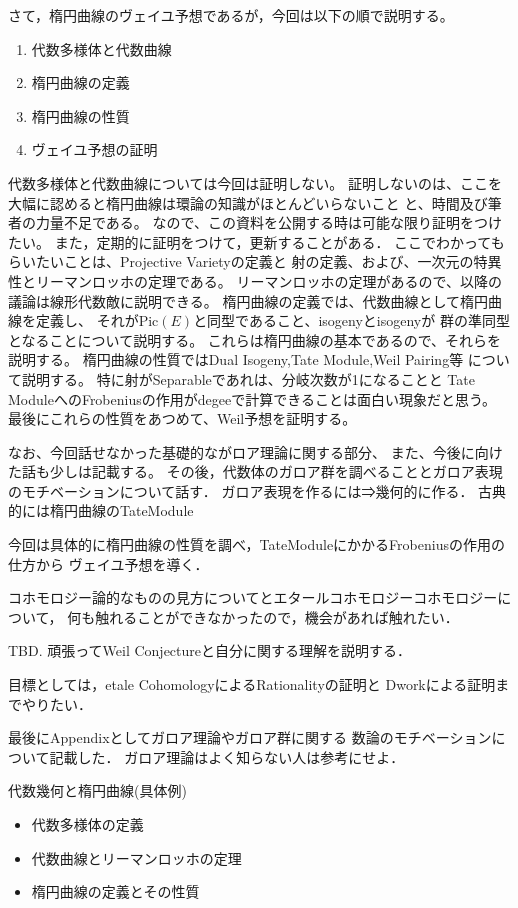 \documentclass{ujarticle}
\begin{document}
さて，楕円曲線のヴェイユ予想であるが，今回は以下の順で説明する。
\begin{enumerate}
  \item 代数多様体と代数曲線
  \item 楕円曲線の定義
  \item 楕円曲線の性質
  \item ヴェイユ予想の証明
\end{enumerate}
代数多様体と代数曲線については今回は証明しない。
証明しないのは、ここを大幅に認めると楕円曲線は環論の知識がほとんどいらないこと
と、時間及び筆者の力量不足である。
なので、この資料を公開する時は可能な限り証明をつけたい。
また，定期的に証明をつけて，更新することがある．
ここでわかってもらいたいことは、Projective Varietyの定義と
射の定義、および、一次元の特異性とリーマンロッホの定理である。
リーマンロッホの定理があるので、以降の議論は線形代数敵に説明できる。
楕円曲線の定義では、代数曲線として楕円曲線を定義し、
それがPic$(E)$と同型であること、isogenyとisogenyが
群の準同型となることについて説明する。
これらは楕円曲線の基本であるので、それらを説明する。
楕円曲線の性質ではDual Isogeny,Tate Module,Weil Pairing等
について説明する。
特に射がSeparableであれは、分岐次数が1になることと
Tate ModuleへのFrobeniusの作用がdegeeで計算できることは面白い現象だと思う。
最後にこれらの性質をあつめて、Weil予想を証明する。


なお、今回話せなかった基礎的ながロア理論に関する部分、
また、今後に向けた話も少しは記載する。
その後，代数体のガロア群を調べることとガロア表現のモチベーションについて話す．
ガロア表現を作るには⇒幾何的に作る．
古典的には楕円曲線のTateModule

今回は具体的に楕円曲線の性質を調べ，TateModuleにかかるFrobeniusの作用の仕方から
ヴェイユ予想を導く．

コホモロジー論的なものの見方についてとエタールコホモロジーコホモロジーについて，
何も触れることができなかったので，機会があれば触れたい．

TBD.
頑張ってWeil Conjectureと自分に関する理解を説明する．

目標としては，etale CohomologyによるRationalityの証明と
Dworkによる証明までやりたい．

最後にAppendixとしてガロア理論やガロア群に関する
数論のモチベーションについて記載した．
ガロア理論はよく知らない人は参考にせよ．



代数幾何と楕円曲線(具体例)
\begin{itemize}
  \setlength{\parskip}{0cm} %
  \setlength{\itemsep}{0cm} %
  \item 代数多様体の定義
  \item 代数曲線とリーマンロッホの定理
  \item 楕円曲線の定義とその性質
\end{itemize}
\end{document}
